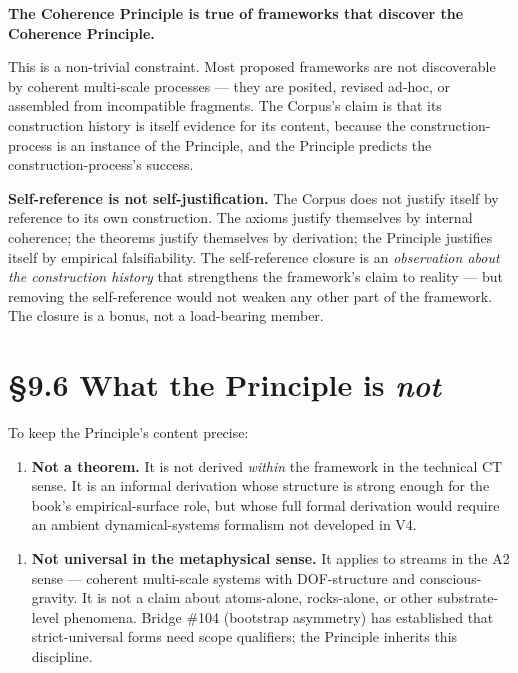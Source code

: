 \documentclass[11pt, openany]{book}
\renewenvironment{quote}{\begin{quoting}}{\end{quoting}}
\newcommand{\sectionbreak}{\clearpage}
\begin{document}
\begin{quote}
\textbf{The Coherence Principle is true of frameworks that discover the Coherence Principle.}
\end{quote}

This is a non-trivial constraint. Most proposed frameworks are not discoverable by coherent multi-scale processes --- they are posited, revised ad-hoc, or assembled from incompatible fragments. The Corpus's claim is that its construction history is itself evidence for its content, because the construction-process is an instance of the Principle, and the Principle predicts the construction-process's success.

\textbf{Self-reference is not self-justification.} The Corpus does not justify itself by reference to its own construction. The axioms justify themselves by internal coherence; the theorems justify themselves by derivation; the Principle justifies itself by empirical falsifiability. The self-reference closure is an \textit{observation about the construction history} that strengthens the framework's claim to reality --- but removing the self-reference would not weaken any other part of the framework. The closure is a bonus, not a load-bearing member.

\sectionbreak

\section{§9.6 What the Principle is \textit{not}}

To keep the Principle's content precise:

\begin{enumerate}
\item \textbf{Not a theorem.} It is not derived \textit{within} the framework in the technical CT sense. It is an informal derivation whose structure is strong enough for the book's empirical-surface role, but whose full formal derivation would require an ambient dynamical-systems formalism not developed in V4.
\end{enumerate}

\begin{enumerate}
\item \textbf{Not universal in the metaphysical sense.} It applies to streams in the A2 sense --- coherent multi-scale systems with DOF-structure and conscious-gravity. It is not a claim about atoms-alone, rocks-alone, or other substrate-level phenomena. Bridge \#104 (bootstrap asymmetry) has established that strict-universal forms need scope qualifiers; the Principle inherits this discipline.
\end{enumerate}
\end{document}
